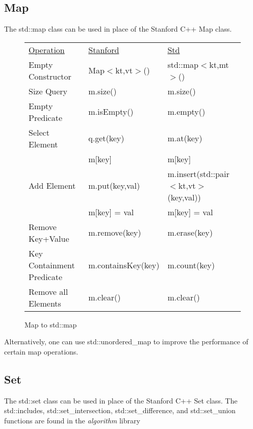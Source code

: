 \documentclass[nobib]{tufte-handout}
\begin{document}
\subsection*{Map}

The std::map class can be used in place of the Stanford C++ Map class.

\begin{figure}[!htbp]
\begin{tabular}{lll}
  \underline{Operation} & \underline{Stanford} & \underline{Std} \\
  Empty Constructor & Map$<$kt,vt$>$() & std::map$<$kt,mt$>$() \\ %
  Size Query & m.size() & m.size() \\ %
  Empty Predicate & m.isEmpty() & m.empty() \\ %
  Select Element & q.get(key) & m.at(key) \\ %
   & m[key] & m[key] \\
  Add Element & m.put(key,val) &  m.insert(std::pair$<$kt,vt$>$(key,val))  \\ %
    & m[key] = val & m[key] = val \\
  Remove Key+Value & m.remove(key) & m.erase(key) \\ %
  Key Containment Predicate & m.containsKey(key) & m.count(key) \\ %
  Remove all Elements & m.clear() & m.clear() \\ %
\end{tabular}
\caption{Map to std::map}
\end{figure}

Alternatively, one can use std::unordered\_map to improve the performance of certain map operations.


\newpage \thispagestyle{empty}

\subsection*{Set}

The std::set class can be used in place of the Stanford C++ Set class. The std::includes, std::set\_intersection, std::set\_difference, and std::set\_union functions are found in the \textit{algorithm} library
\end{document}
